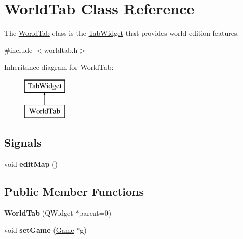 \hypertarget{class_world_tab}{\section{\-World\-Tab \-Class \-Reference}
\label{class_world_tab}
}


\-The \hyperlink{class_world_tab}{\-World\-Tab} class is the \hyperlink{class_tab_widget}{\-Tab\-Widget} that provides world edition features.  




{\ttfamily \#include $<$worldtab.\-h$>$}

\-Inheritance diagram for \-World\-Tab\-:\begin{figure}[H]
\begin{center}
\leavevmode
\includegraphics[height=2.000000cm]{class_world_tab}
\end{center}
\end{figure}
\subsection*{\-Signals}
\begin{DoxyCompactItemize}
\item 
\hypertarget{class_world_tab_a57d3f7150343d03ef60502ebccecd622}{void {\bfseries edit\-Map} ()}\label{class_world_tab_a57d3f7150343d03ef60502ebccecd622}

\end{DoxyCompactItemize}
\subsection*{\-Public \-Member \-Functions}
\begin{DoxyCompactItemize}
\item 
\hypertarget{class_world_tab_a8ad97800dd89af4ee32f97823b67ca8e}{{\bfseries \-World\-Tab} (\-Q\-Widget $\ast$parent=0)}\label{class_world_tab_a8ad97800dd89af4ee32f97823b67ca8e}

\item 
\hypertarget{class_world_tab_ae37b09116218cfcc9b1f184eb88a59ee}{void {\bfseries set\-Game} (\hyperlink{class_game}{\-Game} $\ast$g)}\label{class_world_tab_ae37b09116218cfcc9b1f184eb88a59ee}

\end{DoxyCompactItemize}


